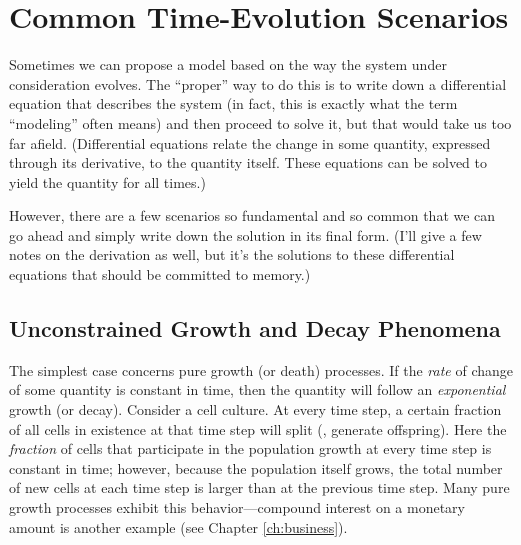 
\section{Common Time-Evolution Scenarios}


Sometimes we can propose a model based on the way the system under
consideration evolves. The ``proper'' way to do this is to write down
a differential equation that describes the system (in fact, this
is exactly what the term ``modeling'' often means) and then 
proceed to solve it, but that would take us too far afield.
(Differential equations relate the change in some quantity, expressed
through its derivative, to the quantity itself. These equations can be
solved to yield the quantity for all times.)

However, there are a few scenarios so fundamental and so common that
we can go ahead and simply write down the solution in its final form.
(I'll give a few notes on the derivation as well, but it's the
solutions to these differential equations that should be committed to
memory.)


\subsection{Unconstrained Growth and Decay Phenomena}

  
The simplest case concerns pure growth (or death) processes. If the
\emph{rate} of change of some quantity is constant in time, then the
quantity will follow an \emph{exponential} growth (or decay).  Consider
a cell culture. At every time step, a certain fraction of all cells in
existence at that time step will split (\ie, generate offspring).
Here the \emph{fraction} of cells that participate in the population
growth at every time step is constant in time; however, because the
population itself grows, the total number of new cells at each time
step is larger than at the previous time step. Many pure growth
processes exhibit this behavior---compound interest on a monetary
amount is another example (see Chapter \ref{ch:business}).


